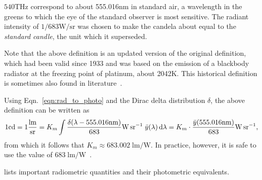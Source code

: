 $\num{540}\unit{\tera\hertz}$ correspond to about \num{555.016}\unit{\nano\meter} in
standard air, a wavelength in the greens to which the eye of the standard observer
is most sensitive.
The radiant intensity of $1/683\unit{\watt\per\steradian}$ was chosen to make the candela about equal to the
\textit{standard candle}, the unit which it superseded. 

Note that the above definition is an updated version of the original definition, which had been
valid since 1933 and was based on the emission of a blackbody radiator
at the freezing point of platinum, about \num{2042}\unit{\kelvin}. This 
historical definition is sometimes also found in literature~\citep{Meyer-Arendt:68}.

Using Eqn.~\eqref{eqn:rad_to_photo} and the Dirac delta distribution $\delta$, the
above definition can be written as
\begin{displaymath}
    1 \unit{\candela} = 1\frac{\unit{\lumen}}{\unit{\steradian}} 
    = K_m \int \frac{\delta(\lambda-555.016\unit{\nano\meter})}{683} \unit{\watt\per\steradian}\;\bar y(\lambda) \d\lambda
    = K_m \cdot \frac{\bar y(555.016\unit{\nano\meter})}{683}\unit{\watt\per\steradian},
\end{displaymath}
from which it follows that $K_m \approx 683.002 \;\unit{\lumen\per\watt}$. In 
practice, however, it is safe to use the value of $683\;\unit{\lumen\per\watt}$~\citep{cie1996,wyszecki2000}.

 lists important radiometric quantities and their photometric equivalents.


